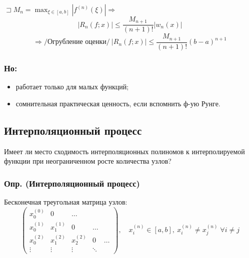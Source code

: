 $\sqsupset M_n = \max_{\xi \in [a, b]} |f^{(n)}(\xi)| \Rightarrow$
\[
|R_n(f; x)| \leq \frac{M_{n+1}}{(n+1)!} |w_n(x)|
\]
\[
\Rightarrow \text{/Огрубление оценки/} ~ |R_n(f; x)| \leq \frac{M_{n+1}}{(n+1)!} (b-a)^{n+1}
\]

\subsubsection*{Но:}
\begin{itemize}
    \item работает только для малых функций;
    \item сомнительная практическая ценность, если вспомнить ф-ую Рунге.
\end{itemize}


\subsection*{Интерполяционный процесс}

Имеет ли место сходимость интерполяционных полиномов к интерполируемой функции при неограниченном росте количества узлов?

\subsubsection*{Опр. (Интерполяционный процесс)}
Бесконечная треугольная матрица узлов:
\[
\begin{pmatrix}
x_0^{(0)} & 0 & \ldots \\
x_0^{(1)} & x_1^{(1)} & 0 & \ldots \\
x_0^{(2)} & x_1^{(2)} & x_2^{(2)} & 0 & \ldots \\
\vdots & \vdots & \vdots & \ddots
\end{pmatrix}, \quad x_i^{(n)} \in [a, b], ~ x_i^{(n)} \neq x_j^{(n)} \; \forall i \neq j
\]

